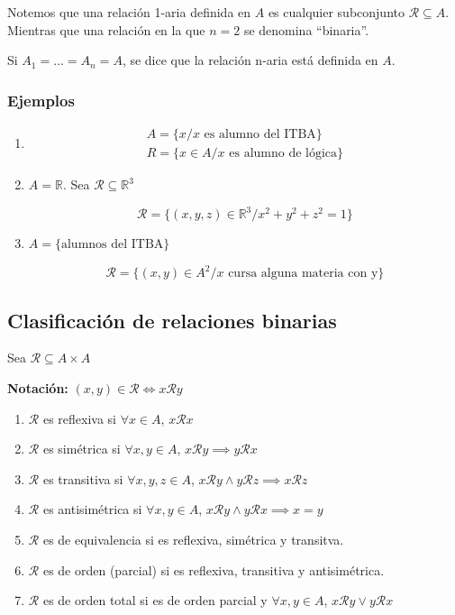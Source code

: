 Notemos que una relación 1-aria definida en $A$ es cualquier 
subconjunto $\mathcal{R} \subseteq A$. Mientras que una relación en
la que $n=2$ se denomina ``binaria''.

Si $A_1 = \dots = A_n = A$, se dice que la relación n-aria está 
definida en $A$.

\subsubsection{Ejemplos}

\begin{enumerate}
    \item
    \begin{gather*}
        A = \{ x/x \text{ es alumno del ITBA} \} \\
        R = \{ x \in A / x \text{ es alumno de lógica} \}
    \end{gather*}

    \item $A = \mathbb{R}$. Sea $\mathcal{R} \subseteq \mathbb{R}^3$

        \[ \mathcal{R} = 
        \{ (x,y,z) \in \mathbb{R}^3 / x^2 + y^2 + z^2 = 1 \} \]

    \item $A = \{ \text{alumnos del ITBA} \}$

        \[ \mathcal{R} 
        = \{ (x,y) \in A^2 / x \text{ cursa alguna materia con y}\} \]
\end{enumerate}

\subsection{Clasificación de relaciones binarias}

Sea $\mathcal{R} \subseteq A \times A$

\bigskip
\textbf{Notación:} $(x,y) \in \mathcal{R} \iff x \mathcal{R} y$

\begin{enumerate}
    \item[\circled{R}] $\mathcal{R}$ es reflexiva si $\forall x \in A$, $x \mathcal{R} x$
    \item[\circled{S}] $\mathcal{R}$ es simétrica si $\forall x,y \in A$, 
        $x \mathcal{R} y \implies y \mathcal{R} x$
    \item[\circled{T}] $\mathcal{R}$ es transitiva si $\forall x, y, z \in A$,
        $x \mathcal{R} y \wedge y \mathcal{R} z \implies x \mathcal{R} z$
    \item[\circled{A}] $\mathcal{R}$ es antisimétrica si $\forall x, y \in A$,
        $x \mathcal{R} y \wedge y \mathcal{R} x \implies x = y$
    \item[\circled{E}] $\mathcal{R}$ es de equivalencia si es reflexiva, simétrica y 
        transitva.
    \item[\circled{O}] $\mathcal{R}$ es de orden (parcial) si es reflexiva, transitiva y
        antisimétrica.
    \item[\circled{OT}] $\mathcal{R}$ es de orden total si es de orden parcial y
        $\forall x, y \in A$, $x \mathcal{R} y \vee y \mathcal{R} x$
\end{enumerate}

